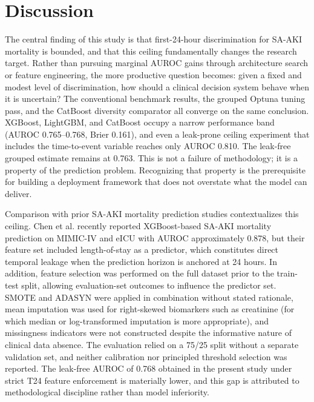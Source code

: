 
\section{Discussion}

The central finding of this study is that first-24-hour discrimination for SA-AKI mortality is bounded, and that this ceiling fundamentally changes the research target. Rather than pursuing marginal AUROC gains through architecture search or feature engineering, the more productive question becomes: given a fixed and modest level of discrimination, how should a clinical decision system behave when it is uncertain? The conventional benchmark results, the grouped Optuna tuning pass, and the CatBoost diversity comparator all converge on the same conclusion. XGBoost, LightGBM, and CatBoost occupy a narrow performance band (AUROC 0.765--0.768, Brier 0.161), and even a leak-prone ceiling experiment that includes the time-to-event variable reaches only AUROC 0.810. The leak-free grouped estimate remains at 0.763. This is not a failure of methodology; it is a property of the prediction problem. Recognizing that property is the prerequisite for building a deployment framework that does not overstate what the model can deliver.

Comparison with prior SA-AKI mortality prediction studies contextualizes this ceiling. Chen et al.\cite{Chen2025} recently reported XGBoost-based SA-AKI mortality prediction on MIMIC-IV and eICU with AUROC approximately 0.878, but their feature set included length-of-stay as a predictor, which constitutes direct temporal leakage when the prediction horizon is anchored at 24 hours. In addition, feature selection was performed on the full dataset prior to the train-test split, allowing evaluation-set outcomes to influence the predictor set. SMOTE and ADASYN were applied in combination without stated rationale, mean imputation was used for right-skewed biomarkers such as creatinine (for which median or log-transformed imputation is more appropriate), and missingness indicators were not constructed despite the informative nature of clinical data absence. The evaluation relied on a 75/25 split without a separate validation set, and neither calibration nor principled threshold selection was reported. The leak-free AUROC of 0.768 obtained in the present study under strict T24 feature enforcement is materially lower, and this gap is attributed to methodological discipline rather than model inferiority.

